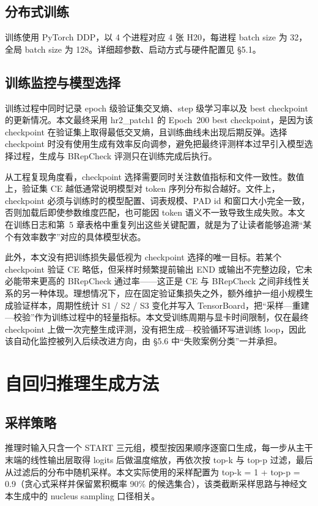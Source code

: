 \subsection{分布式训练}

训练使用 PyTorch DDP，以 4 个进程对应 4 张 H20，每进程 batch size 为 32，全局 batch size 为 128。详细超参数、启动方式与硬件配置见 §5.1。

\subsection{训练监控与模型选择}

训练过程中同时记录 epoch 级验证集交叉熵、step 级学习率以及 best checkpoint 的更新情况。本文最终采用 hr2\_patch1 的 Epoch~200 best checkpoint，是因为该 checkpoint 在验证集上取得最低交叉熵，且训练曲线未出现后期反弹。选择 checkpoint 时没有使用生成有效率反向调参，避免把最终评测样本过早引入模型选择过程，生成与 BRepCheck 评测只在训练完成后执行。

从工程复现角度看，checkpoint 选择需要同时关注数值指标和文件一致性。数值上，验证集 CE 越低通常说明模型对 token 序列分布拟合越好。文件上，checkpoint 必须与训练时的模型配置、词表规模、PAD id 和窗口大小完全一致，否则加载后即使参数维度匹配，也可能因 token 语义不一致导致生成失败。本文在训练日志和第~5 章表格中重复列出这些关键配置，就是为了让读者能够追溯“某个有效率数字”对应的具体模型状态。

此外，本文没有把训练损失最低视为 checkpoint 选择的唯一目标。若某个 checkpoint 验证 CE 略低，但采样时频繁提前输出 END 或输出不完整边段，它未必能带来更高的 BRepCheck 通过率——这正是 CE 与 BRepCheck 之间非线性关系的另一种体现。理想情况下，应在固定验证集损失之外，额外维护一组小规模生成验证样本，周期性统计 S1 / S2 / S3 变化并写入 TensorBoard，把“采样—重建—校验”作为训练过程中的轻量指标。本文受训练周期与显卡时间限制，仅在最终 checkpoint 上做一次完整生成评测，没有把生成—校验循环写进训练 loop，因此该自动化监控被列入后续改进方向，由 §5.6 中“失败案例分类”一并承担。

\section{自回归推理生成方法}

\subsection{采样策略}

推理时输入只含一个 START 三元组，模型按因果顺序逐窗口生成，每一步从主干末端的线性输出层取得 logits 后做温度缩放，再依次按 top-k 与 top-p 过滤，最后从过滤后的分布中随机采样。本文实际使用的采样配置为 top-k = 1 + top-p = 0.9（贪心式采样并保留累积概率 90\% 的候选集合），该类截断采样思路与神经文本生成中的 nucleus sampling 口径相关\cite{holtzman_2020_nucleus}。

